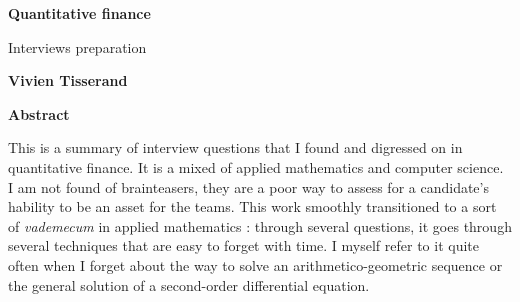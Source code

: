 \begin{titlepage}
   \begin{center}
       \vspace*{1cm}

        \Large
       \textbf{Quantitative finance}

        \large
       \vspace{0.5cm}
        Interviews preparation
            
       \vspace{1.5cm}

       \textbf{Vivien Tisserand}

       \vfill
            
       \vspace{0.8cm}
     

    \textbf{Abstract}
    \end{center}
    
    This is a summary of interview questions that I found and digressed on in quantitative finance. It is a mixed of applied mathematics and computer science.\\
    I am not found of brainteasers, they are a poor way to assess for a candidate's hability to be an asset for the teams. This work smoothly transitioned to a sort of \textit{vademecum} in applied mathematics : through several questions, it goes through several techniques that are easy to forget with time. I myself refer to it quite often when I forget about the way to solve an arithmetico-geometric sequence or the general solution of a second-order differential equation.
    
\end{titlepage}
